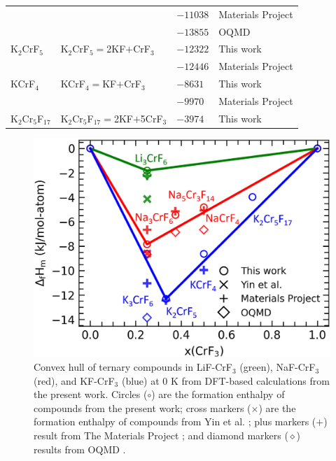 \begin{table}[H]
\begin{tabular}{>{\raggedright\arraybackslash}m{2.5cm}>{\raggedright\arraybackslash}m{5cm}>{\raggedright\arraybackslash}m{3cm}>{\raggedright\arraybackslash}m{5cm}}
    &&$-11038$&Materials Project \cite{jain2013commentary}\\
	&&$-13855$&OQMD \cite{kirklin2015open}\\
    K$_2$CrF$_5$&K$_2$CrF$_5$$=$2KF$+$CrF$_3$&$-12322$&This work\\
	&&$-12446$&Materials Project \cite{jain2013commentary}\\
    KCrF$_4$&KCrF$_4$$=$KF$+$CrF$_3$&$-8631$&This work\\
    &&$-9970$&Materials Project \cite{jain2013commentary}\\
    K$_2$Cr$_5$F$_{17}$&K$_2$Cr$_5$F$_{17}$$=$2KF$+$5CrF$_3$&$-3974$&This work\\
    \hline
    \end{tabular}
    \label{ms:tab:FLiNaK-Cr-Hf}
\end{table}

\begin{figure}[H]
    \centering
    \includegraphics[width=0.5\linewidth]{moltensalts/Moltensalts-FLiNaKCr-DFTHf.jpg}
    \caption{Convex hull of ternary compounds in LiF-CrF$_3$ (green), NaF-CrF$_3$ (red), and KF-CrF$_3$ (blue) at 0 K from DFT-based calculations from the present work. Circles ($\circ$) are the formation enthalpy of compounds from the present work; cross markers ($\times$) are the formation enthalpy of compounds from Yin et al. \cite{yin2018thermodynamic, yin2014thermodynamic}; plus markers ($+$) result from The Materials Project \cite{jain2013commentary}; and diamond markers ($\diamond$) results from OQMD \cite{kirklin2015open}. }
    \label{ms:fig:FLiNaKCr-Hf}
\end{figure}

